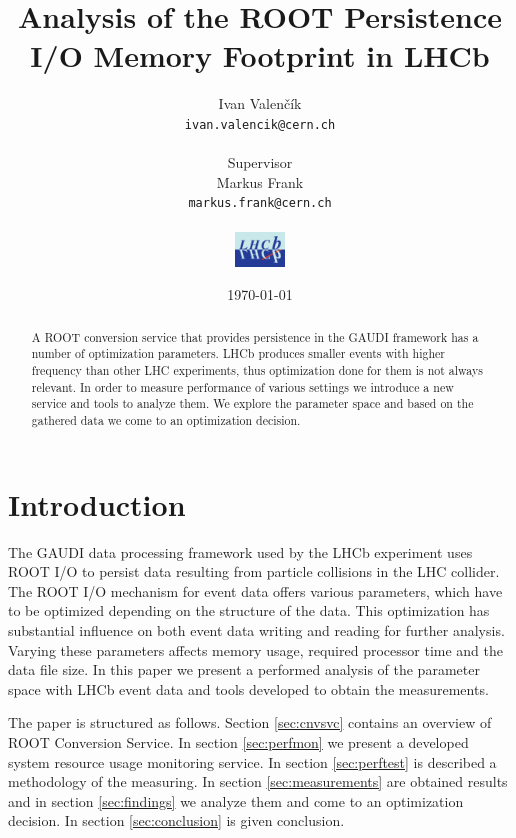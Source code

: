 \documentclass[pdftex,a4paper]{article}
\begin{document}
\title{Analysis of the ROOT Persistence I/O Memory Footprint in LHCb}
\author{
  Ivan Valen\v{c}\'{i}k\\
  \makeatletter
  \texttt{ivan.valencik@cern.ch}\\
  \\
  \small{Supervisor}\\
  Markus Frank\\
  \texttt{markus.frank@cern.ch}\\
  \\
  \includegraphics[width=0.1\textwidth]{Ivan_Valencik_RootCnv_opt_lhcb.jpg}
  \makeatother
}
\date{\today}

\maketitle

\begin{abstract}
A ROOT conversion service that provides persistence in the GAUDI framework has a number of optimization parameters. LHCb produces smaller events with higher frequency than other LHC experiments, thus optimization done for them is not always relevant. In order to measure performance of various settings we introduce a new service and tools to analyze them. We explore the parameter space and based on the gathered data we come to an optimization decision.
\end{abstract}

\section{Introduction}
The GAUDI data processing framework \cite{frank2000} used by the LHCb experiment uses ROOT I/O to persist data resulting from particle collisions in the LHC collider. The ROOT I/O mechanism for event data offers various parameters, which have to be optimized depending on the structure of the data. This optimization has substantial influence on both event data writing and reading for further analysis. Varying these parameters affects memory usage, required processor time and the data file size. In this paper we present a performed analysis of the parameter space with LHCb event data and tools developed to obtain the measurements.

The paper is structured as follows. Section \ref{sec:cnvsvc} contains an overview of ROOT Conversion Service. In section \ref{sec:perfmon} we present a developed system resource usage monitoring service. In section \ref{sec:perftest} is described a methodology of the measuring. In section \ref{sec:measurements} are obtained results and in section \ref{sec:findings} we analyze them and come to an optimization decision. In section \ref{sec:conclusion} is given conclusion.
\end{document}
